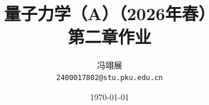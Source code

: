 \title{\textbf{量子力学（A）（2026年春）} \\[0.5em]
    \Large 第二章作业}
\author{冯翊展 \\ 
    \normalsize{\texttt{2400017802@stu.pku.edu.cn}}}
\date{\today}